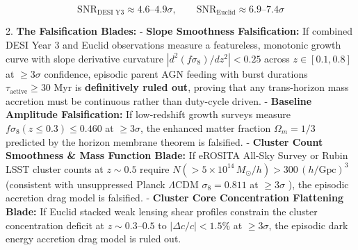 \documentclass[11pt,a4paper]{article}
\theoremstyle{definition}
\theoremstyle{remark}
\begin{document}
\begin{equation}
\text{SNR}_{\text{DESI Y3}} \approx 4.6\text{--}4.9\sigma, \qquad \text{SNR}_{\text{Euclid}} \approx 6.9\text{--}7.4\sigma
\end{equation}


2. \textbf{The Falsification Blades:}
- \textbf{Slope Smoothness Falsification:} If combined DESI Year 3 and Euclid observations measure a featureless, monotonic growth curve with slope derivative curvature $|d^2(f\sigma_8)/dz^2| < 0.25$ across $z \in [0.1, 0.8]$ at $\ge 3\sigma$ confidence, episodic parent AGN feeding with burst durations $\tau_{\text{active}} \ge 30\text{ Myr}$ is \textbf{definitively ruled out}, proving that any trans-horizon mass accretion must be continuous rather than duty-cycle driven.
- \textbf{Baseline Amplitude Falsification:} If low-redshift growth surveys measure $f\sigma_8(z \le 0.3) \le 0.460$ at $\ge 3\sigma$, the enhanced matter fraction $\Omega_m = 1/3$ predicted by the horizon membrane theorem is falsified.
- \textbf{Cluster Count Smoothness \& Mass Function Blade:} If eROSITA All-Sky Survey or Rubin LSST cluster counts at $z \sim 0.5$ require $N(> 5 \times 10^{14} \, M_\odot/h) > 300 \, (h/\text{Gpc})^3$ (consistent with unsuppressed Planck $\Lambda\text{CDM}$ $\sigma_8 = 0.811$ at $\ge 3\sigma$ ), the episodic accretion drag model is falsified.
- \textbf{Cluster Core Concentration Flattening Blade:} If Euclid stacked weak lensing shear profiles constrain the cluster concentration deficit at $z \sim 0.3\text{--}0.5$ to $|\Delta c / c| < 1.5\%$ at $\ge 3\sigma$, the episodic dark energy accretion drag model is ruled out.
\end{document}
